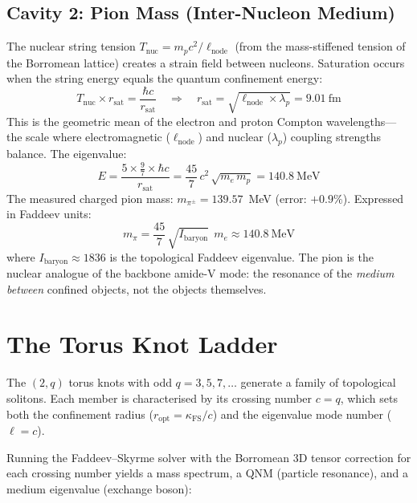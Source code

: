 \subsection{Cavity 2: Pion Mass (Inter-Nucleon Medium)}

The nuclear string tension $T_\mathrm{nuc} = m_p c^2 / \ell_\mathrm{node}$ (from the mass-stiffened tension of the Borromean lattice) creates a strain field between nucleons.  Saturation occurs when the string energy equals the quantum confinement energy:
\begin{equation}
    T_\mathrm{nuc} \times r_\mathrm{sat} = \frac{\hbar c}{r_\mathrm{sat}}
    \quad\Longrightarrow\quad
    r_\mathrm{sat} = \sqrt{\ell_\mathrm{node} \times \lambda_p} = 9.01~\mathrm{fm}
\end{equation}
This is the geometric mean of the electron and proton Compton wavelengths---the scale where electromagnetic ($\ell_\mathrm{node}$) and nuclear ($\lambda_p$) coupling strengths balance.  The eigenvalue:
\begin{equation}
    E = \frac{5 \times \tfrac{9}{7} \times \hbar c}{r_\mathrm{sat}} = \frac{45}{7}\,c^2\,\sqrt{m_e\,m_p} = 140.8~\mathrm{MeV}
\end{equation}
\noindent The measured charged pion mass: $m_{\pi^\pm} = 139.57$~MeV (error: $+0.9\%$).  Expressed in Faddeev units:
\begin{equation}
    \boxed{m_\pi = \frac{45}{7}\,\sqrt{I_\mathrm{baryon}}\;\,m_e \approx 140.8~\mathrm{MeV}}
\end{equation}
where $I_\mathrm{baryon} \approx 1836$ is the topological Faddeev eigenvalue.  The pion is the nuclear analogue of the backbone amide-V mode: the resonance of the \emph{medium between} confined objects, not the objects themselves.


\section{The Torus Knot Ladder}
\label{sec:knot_ladder}

The $(2,q)$ torus knots with odd $q = 3, 5, 7, \ldots$ generate a family of topological solitons.  Each member is characterised by its crossing number $c = q$, which sets both the confinement radius ($r_\mathrm{opt} = \kappa_\mathrm{FS}/c$) and the eigenvalue mode number ($\ell = c$).

Running the Faddeev--Skyrme solver with the Borromean 3D tensor correction for each crossing number yields a mass spectrum, a QNM (particle resonance), and a medium eigenvalue (exchange boson):

